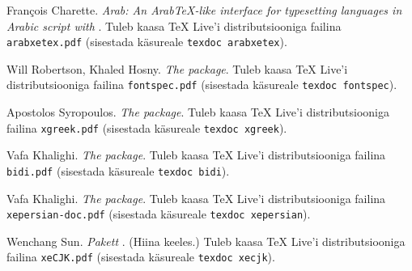 \begin{thebibliography}{99}
 Fran\c{c}ois Charette. \newblock
  \emph{Arab: An Arab\TeX-like interface for typesetting
  languages in Arabic script with }. \newblock Tuleb
  kaasa \TeX{} Live'i distributsiooniga failina \texttt{arabxetex.pdf}
  (sisestada käsureale \texttt{texdoc arabxetex}).

 Will Robertson, Khaled Hosny. \newblock \emph{The
   package}. \newblock Tuleb kaasa \TeX{} Live'i
  distributsiooniga failina \texttt{fontspec.pdf} (sisestada käsureale
  \texttt{texdoc fontspec}).

 Apostolos Syropoulos. \newblock \emph{The 
  package}. \newblock Tuleb kaasa \TeX{} Live'i distributsiooniga failina
  \texttt{xgreek.pdf} (sisestada käsureale \texttt{texdoc xgreek}).

 Vafa Khalighi. \newblock \emph{The  package}.
  \newblock Tuleb kaasa \TeX{} Live'i distributsiooniga failina
  \texttt{bidi.pdf} (sisestada käsureale \texttt{texdoc bidi}).

 Vafa Khalighi. \newblock \emph{The 
  package}. \newblock Tuleb kaasa \TeX{} Live'i distributsiooniga failina
  \texttt{xepersian-doc.pdf} (sisestada käsureale \texttt{texdoc
  xepersian}).

 Wenchang Sun. \newblock \emph{Pakett }. (Hiina
  keeles.) \newblock Tuleb kaasa \TeX{} Live'i distributsiooniga failina
  \texttt{xeCJK.pdf} (sisestada käsureale \texttt{texdoc xecjk}).

\end{thebibliography}

%


